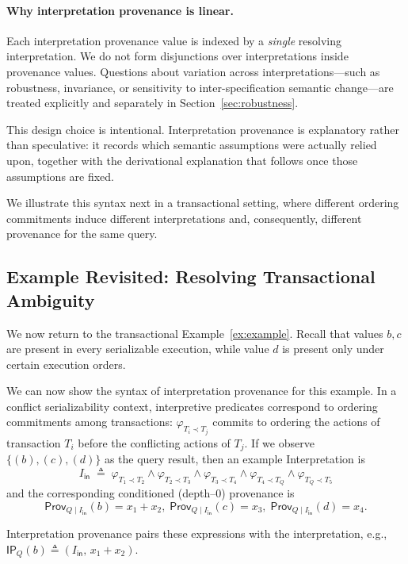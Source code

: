 \documentclass[acmsmall,nonacm]{acmart}
\theoremstyle{remark}
\numberwithin{definition}{section}
\numberwithin{theorem}{section}
\numberwithin{lemma}{section}
\numberwithin{corollary}{section}
\numberwithin{remark}{section}
\numberwithin{example}{section}
\numberwithin{observation}{section}
\numberwithin{assumption}{section}
\newcommand{\Prov}{\mathsf{Prov}}
\begin{document}
\paragraph{Why interpretation provenance is linear.}
Each interpretation provenance value is indexed by a \emph{single} resolving
interpretation.
We do not form disjunctions over interpretations inside provenance values.
Questions about variation across interpretations—such as robustness,
invariance, or sensitivity to inter-specification semantic change—are treated explicitly and
separately in Section~\ref{sec:robustness}.

This design choice is intentional.
Interpretation provenance is explanatory rather than speculative: it records
which semantic assumptions were actually relied upon, together with the
derivational explanation that follows once those assumptions are fixed.

We illustrate this syntax next in a transactional setting, where
different ordering commitments induce different interpretations and,
consequently, different provenance for the same query.

\subsection{Example Revisited: Resolving Transactional Ambiguity}
\label{sec:concurrency}

We now return to the transactional Example~\ref{ex:example}.
Recall that values $b, c$ are present in every serializable execution, while value $d$
is present only under certain execution orders.

We can now show the syntax of interpretation provenance for this example.
In a conflict serializability context, interpretive predicates correspond to ordering
commitments among transactions: $\varphi_{T_i \prec T_j}$ commits to
ordering the actions of transaction $T_i$ before the conflicting actions of $T_j$.
If we observe $\{(b), (c), (d)\}$ as the query result, then an example Interpretation is 
\[
I_{\mathsf{in}} \;\triangleq\; \varphi_{T_1 \prec T_2} \wedge \varphi_{T_2 \prec T_3} \wedge \varphi_{T_3 \prec T_4} \wedge \varphi_{T_4 \prec T_Q} \wedge \varphi_{T_Q \prec T_5}
\]
and the corresponding conditioned (depth--0) provenance is
\[
  \Prov_{Q \mid I_{\mathsf{in}}}(b)=x_1+x_2,\;
  \Prov_{Q \mid I_{\mathsf{in}}}(c)=x_3,\;
  \Prov_{Q \mid I_{\mathsf{in}}}(d)=x_4.
\]

Interpretation provenance pairs these expressions with the interpretation,
e.g., $\mathsf{IP}_Q(b) \triangleq (I_{\mathsf{in}},\, x_1+x_2)$.
\end{document}
